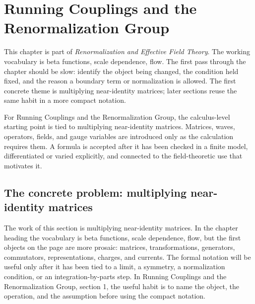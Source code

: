 \chapter{Running Couplings and the Renormalization Group}


This chapter is part of \emph{Renormalization and Effective Field Theory}.  The working vocabulary is beta functions, scale dependence, flow.  The first pass through the chapter should be slow: identify the object being changed, the condition held fixed, and the reason a boundary term or normalization is allowed.  The first concrete theme is multiplying near-identity matrices; later sections reuse the same habit in a more compact notation.

For Running Couplings and the Renormalization Group, the calculus-level starting point is tied to multiplying near-identity matrices.  Matrices, waves, operators, fields, and gauge variables are introduced only as the calculation requires them.  A formula is accepted after it has been checked in a finite model, differentiated or varied explicitly, and connected to the field-theoretic use that motivates it.

\section{The concrete problem: multiplying near-identity matrices}













The work of this section is multiplying near-identity matrices.  In the chapter heading the vocabulary is beta functions, scale dependence, flow, but the first objects on the page are more prosaic: matrices, transformations, generators, commutators, representations, charges, and currents.  The formal notation will be useful only after it has been tied to a limit, a symmetry, a normalization condition, or an integration-by-parts step.  In Running Couplings and the Renormalization Group, section 1, the useful habit is to name the object, the operation, and the assumption before using the compact notation.

